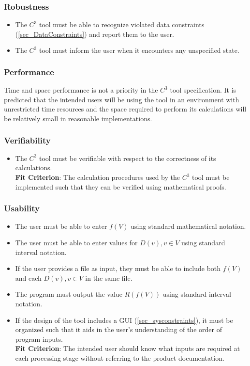 \documentclass[12pt]{article}
\newcommand{\prognameAbbrv}{$C^{3}$}
\begin{document}
\subsubsection*{Robustness}
\begin{itemize}
	\item The \prognameAbbrv{} tool must be able to recognize violated data 
	constraints (\ref{sec_DataConstraints}) and report them to the user.
	\item The \prognameAbbrv{} tool must inform the user when it encounters any 
	unspecified state.
\end{itemize}

\subsubsection*{Performance}
Time and space performance is not a priority in the \prognameAbbrv{} tool 
specification. It is predicted that the intended users will be using the tool 
in an environment with unrestricted time resources and the space required to 
perform its calculations will be relatively small in reasonable implementations.

\subsubsection*{Verifiability}
\begin{itemize}
	\item The \prognameAbbrv{} tool must be verifiable with respect to the 
	correctness of its calculations.\\ \textbf{Fit Criterion}: The calculation 
	procedures used by the \prognameAbbrv{} tool must be implemented such that 
	they can be verified using mathematical proofs.
\end{itemize}

\subsubsection*{Usability}
\begin{itemize}
	\item The user must be able to enter $f(V)$ using standard mathematical 
	notation.
	\item The user must be able to enter values for $D(v), v \in V$ using 
	standard 
	interval notation.
	\item If the user provides a file as input, they must be able to include 
	both $f(V)$ and each $D(v), v \in V$ in the same file.
	\item The program must output the value $R(f(V))$ using standard interval 
	notation.
	\item If the design of the tool includes a GUI (\ref{sec_sysconstraints}), 
	it must be organized such that it aids in the user's understanding of the 
	order of program inputs.\\\textbf{Fit Criterion}: The intended user should 
	know what inputs are required at each processing stage without referring to 
	the product documentation.
\end{itemize}
\end{document}
